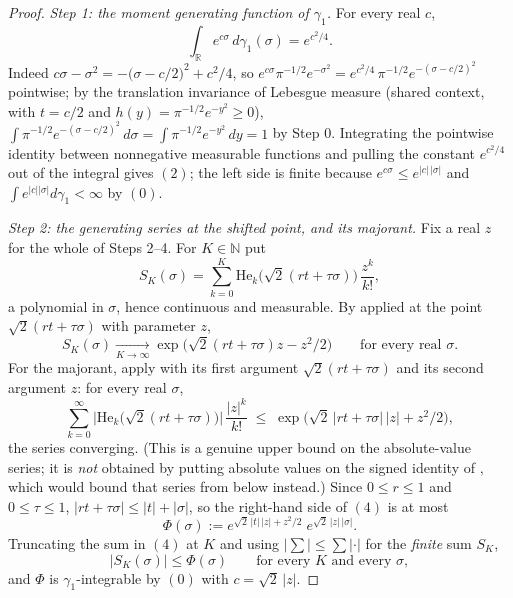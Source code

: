 \begin{proof}
\emph{Step 1: the moment generating function of $\gamma_1$.}
For every real $c$,
\begin{equation*}
  \int_{\mathbb{R}} e^{c\sigma}\, d\gamma_1(\sigma) = e^{c^2/4} .
  \tag{2}
\end{equation*}
Indeed $c\sigma - \sigma^2 = -\bigl(\sigma - c/2\bigr)^2 + c^2/4$, so
$e^{c\sigma}\pi^{-1/2}e^{-\sigma^2} = e^{c^2/4}\,\pi^{-1/2}e^{-(\sigma - c/2)^2}$
pointwise; by the translation invariance of Lebesgue measure (shared context,
with $t = c/2$ and $h(y) = \pi^{-1/2}e^{-y^2} \geq 0$),
$\int \pi^{-1/2}e^{-(\sigma-c/2)^2}\,d\sigma = \int \pi^{-1/2}e^{-y^2}\,dy = 1$ by
Step 0.  Integrating the pointwise identity between nonnegative measurable
functions and pulling the constant $e^{c^2/4}$ out of the integral gives $(2)$;
the left side is finite because $e^{c\sigma} \leq e^{|c|\,|\sigma|}$ and
$\int e^{|c||\sigma|}d\gamma_1 < \infty$ by $(0)$.

\emph{Step 2: the generating series at the shifted point, and its majorant.}
Fix a real $z$ for the whole of Steps 2--4.  For $K \in \mathbb{N}$ put
\[
  S_K(\sigma) = \sum_{k=0}^{K} \mathrm{He}_k\bigl(\sqrt2(rt+\tau\sigma)\bigr)\,\frac{z^k}{k!},
\]
a polynomial in $\sigma$, hence continuous and measurable.  By
 applied at the point $\sqrt2(rt+\tau\sigma)$ with
parameter $z$,
\begin{equation*}
  S_K(\sigma) \xrightarrow[K\to\infty]{}
    \exp\bigl(\sqrt2(rt+\tau\sigma)z - z^2/2\bigr)
  \qquad\text{for every real } \sigma .
  \tag{3}
\end{equation*}
For the majorant, apply  with its first argument
$\sqrt2(rt+\tau\sigma)$ and its second argument $z$: for every real $\sigma$,
\begin{equation*}
  \sum_{k=0}^\infty \bigl|\mathrm{He}_k\bigl(\sqrt2(rt+\tau\sigma)\bigr)\bigr|\,
      \frac{|z|^k}{k!}
    \;\leq\; \exp\bigl(\sqrt2\,|rt+\tau\sigma|\,|z| + z^2/2\bigr),
  \tag{4}
\end{equation*}
the series converging.  (This is a genuine upper bound on the absolute-value
series; it is \emph{not} obtained by putting absolute values on the signed
identity of , which would bound that series from below
instead.)  Since $0 \leq r \leq 1$ and $0 \leq \tau \leq 1$,
$|rt + \tau\sigma| \leq |t| + |\sigma|$, so the right-hand side of $(4)$ is at
most
\[
  \Phi(\sigma) := e^{\sqrt2\,|t|\,|z| + z^2/2}\; e^{\sqrt2\,|z|\,|\sigma|} .
\]
Truncating the sum in $(4)$ at $K$ and using $|\sum| \leq \sum|\cdot|$ for the
\emph{finite} sum $S_K$,
\begin{equation*}
  \bigl|S_K(\sigma)\bigr| \leq \Phi(\sigma)
  \qquad\text{for every } K \text{ and every } \sigma,
  \tag{5}
\end{equation*}
and $\Phi$ is $\gamma_1$-integrable by $(0)$ with $c = \sqrt2\,|z|$.


\end{proof}
